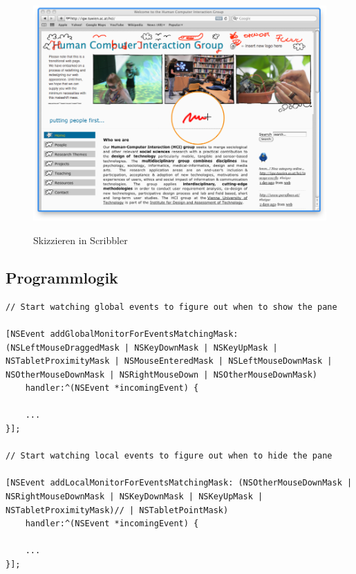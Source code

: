 \begin{figure}
        {\includegraphics[width=1\linewidth]{gfx/scribblerSketching}}
		\caption[Skizzieren in Scribbler]{Skizzieren in Scribbler}\label{fig:scribblerSketching}
\end{figure}

\subsection{Programmlogik} \label{sec:programmLogik}
\begin{lstlisting}[float,caption=Global and Local Event Monitoring]
// Start watching global events to figure out when to show the pane
	
[NSEvent addGlobalMonitorForEventsMatchingMask: (NSLeftMouseDraggedMask | NSKeyDownMask | NSKeyUpMask | NSTabletProximityMask | NSMouseEnteredMask | NSLeftMouseDownMask | NSOtherMouseDownMask | NSRightMouseDown | NSOtherMouseDownMask)
    handler:^(NSEvent *incomingEvent) {
	
    ...
}];

// Start watching local events to figure out when to hide the pane	

[NSEvent addLocalMonitorForEventsMatchingMask: (NSOtherMouseDownMask | NSRightMouseDownMask | NSKeyDownMask | NSKeyUpMask | NSTabletProximityMask)// | NSTabletPointMask)
    handler:^(NSEvent *incomingEvent) {

    ...
}];		
\end{lstlisting}

